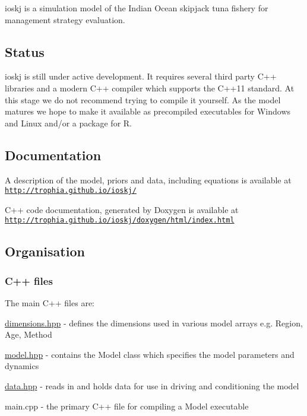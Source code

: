 {\ttfamily ioskj} is a simulation model of the Indian Ocean skipjack tuna fishery for management strategy evaluation.

\subsection*{Status}

{\ttfamily ioskj} is still under active development. It requires several third party C++ libraries and a modern C++ compiler which supports the C++11 standard. At this stage we do not recommend trying to compile it yourself. As the model matures we hope to make it available as precompiled executables for Windows and Linux and/or a package for R.

\subsection*{Documentation}

A description of the model, priors and data, including equations is available at \href{http://trophia.github.io/ioskj/}{\tt http\-://trophia.\-github.\-io/ioskj/}

C++ code documentation, generated by Doxygen is available at \href{http://trophia.github.io/ioskj/doxygen/html/index.html}{\tt http\-://trophia.\-github.\-io/ioskj/doxygen/html/index.\-html}

\subsection*{Organisation}

\subsubsection*{C++ files}

The main C++ files are\-:


\begin{DoxyItemize}
\item {\ttfamily \hyperlink{dimensions_8hpp_source}{dimensions.\-hpp}} -\/ defines the dimensions used in various model arrays e.\-g. {\ttfamily Region}, {\ttfamily Age}, {\ttfamily Method}
\item {\ttfamily \hyperlink{model_8hpp_source}{model.\-hpp}} -\/ contains the {\ttfamily Model} class which specifies the model parameters and dynamics
\item {\ttfamily \hyperlink{data_8hpp_source}{data.\-hpp}} -\/ reads in and holds data for use in driving and conditioning the model
\item {\ttfamily main.\-cpp} -\/ the primary C++ file for compiling a {\ttfamily Model} executable
\end{DoxyItemize}


